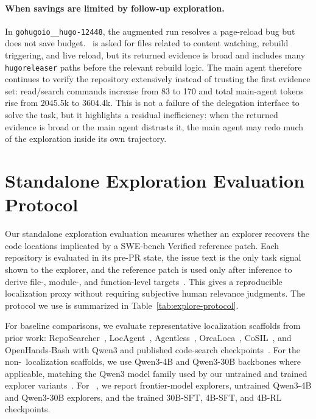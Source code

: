 \documentclass{llmxive}
\providecommand{\approach}{~}
\begin{document}
\paragraph{When savings are limited by follow-up exploration.}
In \texttt{gohugoio\_\_hugo-12448}, the augmented run resolves a page-reload bug but does not save budget.
\approach is asked for files related to content watching, rebuild triggering, and live reload, but its returned evidence is broad and includes many \texttt{hugoreleaser} paths before the relevant rebuild logic.
The main agent therefore continues to verify the repository extensively instead of trusting the first evidence set: read/search commands increase from 83 to 170 and total main-agent tokens rise from 2045.5k to 3604.4k.
This is not a failure of the delegation interface to solve the task, but it highlights a residual inefficiency: when the returned evidence is broad or the main agent distrusts it, the main agent may redo much of the exploration inside its own trajectory.

\section{Standalone Exploration Evaluation Protocol}
\label{app:explore-eval}

Our standalone exploration evaluation measures whether an explorer recovers the code locations implicated by a SWE-bench Verified reference patch.
Each repository is evaluated in its pre-PR state, the issue text is the only task signal shown to the explorer, and the reference patch is used only after inference to derive file-, module-, and function-level targets~\cite{codescout}.
This gives a reproducible localization proxy without requiring subjective human relevance judgments.
The protocol we use is summarized in Table~\ref{tab:explore-protocol}.

For baseline comparisons, we evaluate representative localization scaffolds from prior work: RepoSearcher~\cite{reposearcher}, LocAgent~\cite{locagent}, Agentless~\cite{agentless}, OrcaLoca~\cite{orcaloca}, CoSIL~\cite{cosil}, and OpenHands-Bash with Qwen3 and published code-search checkpoints~\cite{openhands,codescout}.
For the non-\approach localization scaffolds, we use Qwen3-4B and Qwen3-30B backbones where applicable, matching the Qwen3 model family used by our untrained and trained explorer variants~\cite{qwen3}.
For \approach, we report frontier-model explorers, untrained Qwen3-4B and Qwen3-30B explorers, and the trained 30B-SFT, 4B-SFT, and 4B-RL checkpoints.
\end{document}
